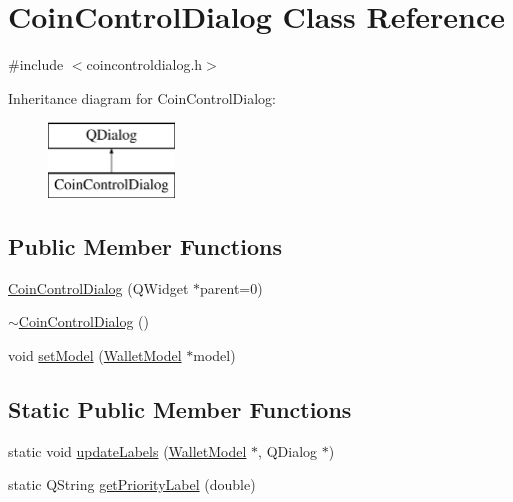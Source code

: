 \hypertarget{class_coin_control_dialog}{}\section{Coin\+Control\+Dialog Class Reference}
\label{class_coin_control_dialog}


{\ttfamily \#include $<$coincontroldialog.\+h$>$}

Inheritance diagram for Coin\+Control\+Dialog\+:\begin{figure}[H]
\begin{center}
\leavevmode
\includegraphics[height=2.000000cm]{class_coin_control_dialog}
\end{center}
\end{figure}
\subsection*{Public Member Functions}
\begin{DoxyCompactItemize}
\item 
\hyperlink{class_coin_control_dialog_a0945e59c25f956fdab199dbaf252eff5}{Coin\+Control\+Dialog} (Q\+Widget $\ast$parent=0)
\item 
\hyperlink{class_coin_control_dialog_abbd976ba19011319d5e189f87db66e31}{$\sim$\+Coin\+Control\+Dialog} ()
\item 
void \hyperlink{class_coin_control_dialog_a4c34a48574814089c54f763a22f5317a}{set\+Model} (\hyperlink{class_wallet_model}{Wallet\+Model} $\ast$model)
\end{DoxyCompactItemize}
\subsection*{Static Public Member Functions}
\begin{DoxyCompactItemize}
\item 
static void \hyperlink{class_coin_control_dialog_a4fc60e89b097952ff22dc0f9c58c87d9}{update\+Labels} (\hyperlink{class_wallet_model}{Wallet\+Model} $\ast$, Q\+Dialog $\ast$)
\item 
static Q\+String \hyperlink{class_coin_control_dialog_a7285f91e6d9b510084966f4229146bcd}{get\+Priority\+Label} (double)
\end{DoxyCompactItemize}
